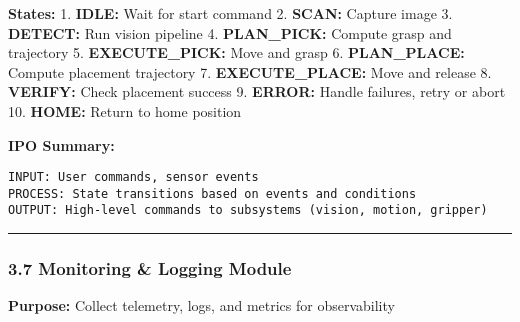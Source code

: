 \documentclass[
]{article}
\begin{document}
\textbf{States:} 1. \textbf{IDLE:} Wait for start command 2.
\textbf{SCAN:} Capture image 3. \textbf{DETECT:} Run vision pipeline 4.
\textbf{PLAN\_PICK:} Compute grasp and trajectory 5.
\textbf{EXECUTE\_PICK:} Move and grasp 6. \textbf{PLAN\_PLACE:} Compute
placement trajectory 7. \textbf{EXECUTE\_PLACE:} Move and release 8.
\textbf{VERIFY:} Check placement success 9. \textbf{ERROR:} Handle
failures, retry or abort 10. \textbf{HOME:} Return to home position

\textbf{IPO Summary:}

\begin{verbatim}
INPUT: User commands, sensor events
PROCESS: State transitions based on events and conditions
OUTPUT: High-level commands to subsystems (vision, motion, gripper)
\end{verbatim}

\begin{center}\rule{0.5\linewidth}{0.5pt}\end{center}

\hypertarget{monitoring-logging-module}{%
\subsubsection{3.7 Monitoring \& Logging
Module}\label{monitoring-logging-module}}

\textbf{Purpose:} Collect telemetry, logs, and metrics for observability
\end{document}
